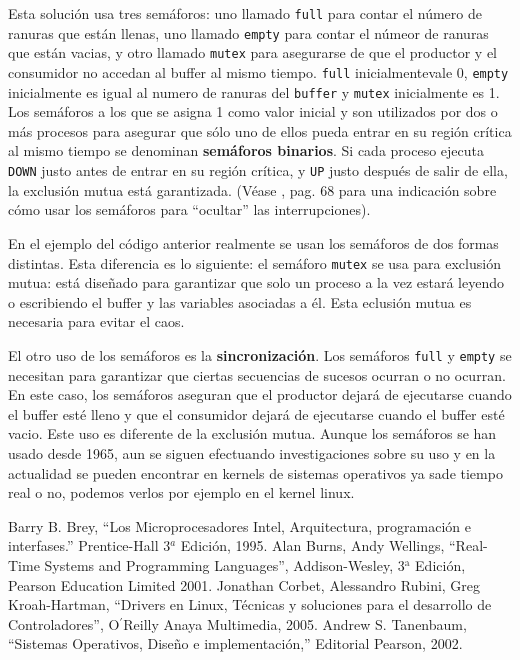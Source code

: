 \documentclass{article}
\begin{document}
Esta soluci\'on usa tres sem\'aforos: uno llamado {\tt full} para contar el n\'umero 
de ranuras que est\'an llenas, uno llamado {\tt empty} para contar el n\'umeor de ranuras 
que est\'an vacias, y otro llamado {\tt mutex} para asegurarse de que el productor y el 
consumidor no accedan al buffer al mismo tiempo. {\tt full} inicialmentevale 0, 
{\tt empty} inicialmente es igual al numero de ranuras del {\tt buffer} y {\tt mutex} 
inicialmente es 1. Los sem\'aforos a los que se asigna 1 como valor inicial y son 
utilizados por dos o m\'as procesos para asegurar que s\'olo uno de ellos pueda entrar 
en su regi\'on cr\'itica al mismo tiempo se denominan {\bf sem\'aforos binarios}. Si 
cada proceso ejecuta {\tt DOWN} justo antes de entrar en su regi\'on cr\'itica, y {\tt UP} 
justo despu\'es de salir de ella, la exclusi\'on mutua est\'a garantizada. (V\'ease 
\cite{Tanenbaum}, pag. 68 para una indicaci\'on sobre c\'omo usar los sem\'aforos 
para ``ocultar'' las interrupciones). 

En el ejemplo del c\'odigo anterior realmente se usan los sem\'aforos de dos formas 
distintas. Esta diferencia es lo siguiente: el sem\'aforo {\tt mutex} se usa para 
exclusi\'on mutua: est\'a dise\~nado para garantizar que solo un proceso a la vez estar\'a 
leyendo o escribiendo el buffer y las variables asociadas a \'el. Esta eclusi\'on mutua es 
necesaria para evitar el caos.

El otro uso de los sem\'aforos es la {\bf sincronizaci\'on}. Los sem\'aforos {\tt full} y 
{\tt empty} se necesitan para garantizar que ciertas secuencias de sucesos ocurran o no 
ocurran. En este caso, los sem\'aforos aseguran que el productor dejar\'a de ejecutarse 
cuando el buffer est\'e lleno y que el consumidor dejar\'a de ejecutarse cuando el buffer 
est\'e vacio. Este uso es diferente de la exclusi\'on mutua. Aunque los sem\'aforos se han 
usado desde 1965, aun se siguen efectuando investigaciones sobre su uso y en la actualidad 
se pueden encontrar en kernels de sistemas operativos ya sade tiempo real o no, podemos 
verlos por ejemplo en el kernel linux.


\eject
\begin{thebibliography}{9}
Barry B. Brey, ``Los Microprocesadores Intel, 
Arquitectura, programaci\'on e interfases.'' Prentice-Hall 
3$^{a}$ Edici\'on, 1995.
Alan Burns, Andy Wellings, ``Real-Time Systems and 
Programming Languages'', Addison-Wesley, 3$^{\mbox{a}}$ Edici\'on, 
Pearson Education Limited 2001.
Jonathan Corbet, Alessandro Rubini, Greg Kroah-Hartman, 
``Drivers en Linux, T\'ecnicas y soluciones para el desarrollo de 
Controladores'', O$^{\prime}$Reilly Anaya Multimedia, 2005.
Andrew S. Tanenbaum, ``Sistemas Operativos, 
Dise\~no e implementaci\'on,'' Editorial Pearson, 2002.
\end{thebibliography}
\end{document}
